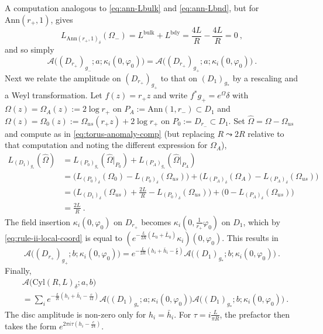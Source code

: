 \documentclass[11pt,a4paper]{article}
\numberwithin{equation}{section}
\begin{document}
A computation analogous to \eqref{eq:ann-Lbulk} and \eqref{eq:ann-Lbnd}, but for $\mathrm{Ann}(r_+,1)$, gives
\begin{equation}
    L_{\mathrm{Ann}(r_+,1)_\delta}(\Omega_-)
    = L^\text{bulk} + L^\text{bdy} = \frac{4L}{R} - \frac{4L}{R}  = 0\ ,
\end{equation}
and so simply
\begin{equation}
    \mathcal{A}\big((D_{r_+})_{g_-};a;\kappa_i(0,\varphi_0)
    \big)
    =
    \mathcal{A}\big((D_{r_+})_{g_+};a;\kappa_i(0,\varphi_0)
    \big)
    \ .
\end{equation}
Next we relate the amplitude on $(D_{r_+})_{g_+}$ to that on $(D_1)_{g_*}$ by a rescaling and a Weyl transformation. Let $f(z) = r_+ z$ and write $f^*g_+ = e^{\Omega} \delta$ with $\Omega(z) = \Omega_A(z) := 2 \log r_+$ on $P_A := \mathrm{Ann}(1,r_-) \subset D_1$ and $\Omega(z) = \Omega_0(z) := \Omega_{us}(r_+ z) + 2 \log r_+$ on $P_0 := D_{r_-} \subset D_1$. Set $\hat\Omega = \Omega - \Omega_{us}$ and compute as in \eqref{eq:torus-anomaly-comp} (but replacing $R \leadsto 2R$ relative to that computation and noting the different expression for $\Omega_A$),
\begin{align}
    L_{{(D_1)}_{g_*}}(\hat\Omega)
    &=
    L_{(P_0)_{g_*}}(\hat\Omega|_{P_0})
    +
    L_{(P_A)_{g_*}}(\hat\Omega|_{P_A})
    \nonumber
    \\
    &=
    \big(
        L_{(P_0)_{\delta}}(\Omega_0)
        -
        L_{(P_0)_{\delta}}(\Omega_{us})
    \big)
    +
    \big(
        L_{(P_A)_{\delta}}(\Omega_A)
        -
        L_{(P_A)_{\delta}}(\Omega_{us})
    \big)
    \nonumber
    \\
    &= \big(L_{(D_1)_\delta}(\Omega_{us}) + \tfrac{2L}R  - L_{(P_0)_\delta}(\Omega_{us}) \big)
    + \Big(0  - L_{(P_A)_\delta}(\Omega_{us})  \big)
        \nonumber
    \\
    &= \frac{2L}R \ .
\end{align}
The field insertion $\kappa_i(0,\varphi_0)$ on $D_{r_+}$ becomes $\kappa_i(0,\frac{1}{r_+}\varphi_0)$ on $D_{1}$, which by \eqref{eq:rule-ii-local-coord} is equal to $(e^{-\frac{L}{2R}(L_0+\bar L_0)}\kappa_i)(0,\varphi_0)$. 
This results in
\begin{equation}\label{eq:ann-closed-fact-aux2}
    \mathcal{A}\big((D_{r_+})_{g_+};b;\kappa_i(0,\varphi_0)\big)
    =
    e^{-\frac{L}{2R}(h_i+\bar h_i-\frac{c}{6})}
    \mathcal{A}\big((D_{1})_{g_*};b;\kappa_i(0,\varphi_0)
    \big)
    \ .
\end{equation}
Finally,
\begin{align}\label{eq:cylinder-bulk-channel}
    &\mathcal{A}\big(\mathrm{Cyl}(R,L)_\delta;a,b\big) 
\nonumber \\
& 
= 
\sum_i e^{-\frac{L}{R}(h_i + \bar h_i - \frac{c}{12})} 
\mathcal{A}\big((D_{1})_{g_*};a;\kappa_i(0,\varphi_0)
    \big)
\mathcal{A}\big((D_{1})_{g_*};b;\kappa_i(0,\varphi_0)
    \big)    
 \ .
\end{align}
The disc amplitude is non-zero only for $h_i = \bar h_i$.
For $\tau = i \frac{L}{\pi R}$,
the prefactor then takes the form $e^{2 \pi i \tau (h_i - \frac{c}{24})}$.
\end{document}
